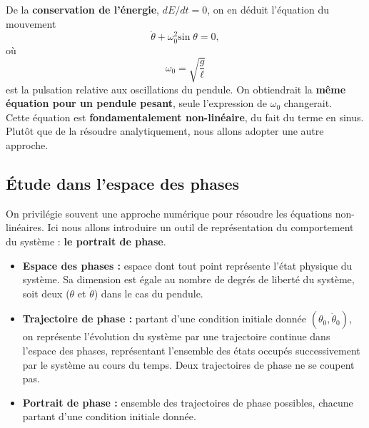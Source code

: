 \documentclass[11pt,a4paper]{report}
\begin{document}
De la \textbf{conservation de l'énergie}, $dE/dt = 0$, on en déduit l'équation du mouvement
\begin{equation}
	\boxed{\ddot{\theta} + \omega_0^2 \text{sin}\;\theta = 0},
\end{equation}
où 
\begin{equation}
	\omega_0 = \sqrt{\frac{g}{\ell}}
\end{equation}
est la pulsation relative aux oscillations du pendule. On obtiendrait la \textbf{même équation pour un pendule pesant}, seule l'expression de $\omega_0$ changerait.\\

Cette équation est \textbf{fondamentalement non-linéaire}, du fait du terme en sinus. Plutôt que de la résoudre analytiquement, nous allons adopter une autre approche.

\subsection{Étude dans l'espace des phases}

On privilégie souvent une approche numérique pour résoudre les équations non-linéaires. Ici nous allons introduire un outil de représentation du comportement du système : \textbf{le portrait de phase}.\\

\begin{itemize}
	\item \textbf{Espace des phases :} espace dont tout point représente l'état physique du système. Sa dimension est égale au nombre de degrés de liberté du système, soit deux ($\theta$ et $\dot{\theta}$) dans le cas du pendule.\\
	
	\item \textbf{Trajectoire de phase :} partant d'une condition initiale donnée $(\theta_0, \dot{\theta}_0)$, on représente l'évolution du système par une trajectoire continue dans l'espace des phases, représentant l'ensemble des états occupés successivement par le système au cours du temps. Deux trajectoires de phase ne se coupent pas.\\
	
	\item \textbf{Portrait de phase :} ensemble des trajectoires de phase possibles, chacune 		partant d'une condition initiale donnée.\\
\end{itemize}
\end{document}
